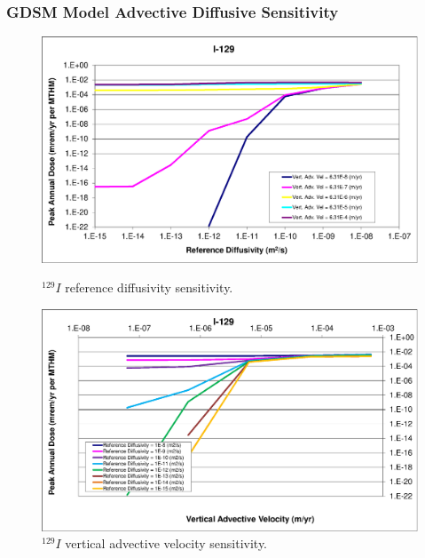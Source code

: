 
\begin{frame}[ctb!]
\frametitle{GDSM Model Advective Diffusive Sensitivity}

\begin{figure}[htp!]
\begin{minipage}[b]{0.45\linewidth}
\centering
\includegraphics[width=\linewidth]{./nuclide_demonstration/AdvVelDiff/I-129.eps}
\caption{$^{129}I$ reference diffusivity sensitivity.}
\label{fig:VAdvVelI129}

\end{minipage}
\hspace{0.05\linewidth}
\begin{minipage}[b]{0.45\linewidth}

\includegraphics[width=\linewidth]{./nuclide_demonstration/AdvVelDiff/I-129-VAdvVel.eps}
\caption{$^{129}I$ vertical advective velocity sensitivity.}
\label{fig:VAdvVelI129VAdvVel}

\end{minipage}
\end{figure}
\end{frame}
